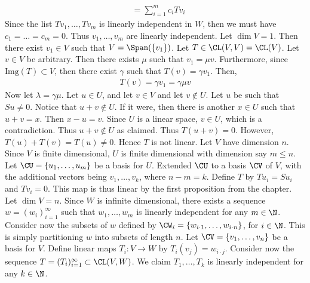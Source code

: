 \documentclass{book}
\begin{document}
\begin{enumerate}[label=\arabic*)]
\begin{align*}
        & = \sum_{i = 1}^{m}c_iTv_i
      \end{align*}
      Since the list $Tv_1, \dots, Tv_m$ is linearly independent in $W$, then we must have $c_1 = \dots = c_m = 0$. Thus $v_1, \dots, v_m$ are linearly independent. 
    \ii
    \ii
    \ii
      Let $\dim V = 1$. Then there exist $v_1 \in V$ such that $V = \Span(\{v_1\})$. Let $T \in \CL(V, V) = \CL(V)$. Let $v \in V$ be arbitrary. Then there exists $\mu$ such that $v_1 = \mu
      v$.  Furthermore, since $\text{Img}(T) \subset V$, then there exist $\gamma$ such that $T(v) = \gamma v_1$. Then,
      \begin{align*}
        T(v) = \gamma v_1 = \gamma\mu v
      \end{align*}
      Now let $\lambda = \gamma\mu$.
    \ii
    \ii
    \ii
      Let $u \in U$, and let $v \in V$ and let $v \not\in U$. Let $u$ be such that $Su \neq 0$. Notice that $u + v \not\in U$. If it were, then there is another $x \in U$ such that $u + v =
      x$. Then $x - u = v$. Since $U$ is a linear space, $v \in U$, which is a contradiction. Thus $u + v \not\in U$ as claimed. Thus $T(u + v) = 0$. However, $T(u) + T(v) = T(u) \neq 0$.
      Hence $T$ is not linear.
    \ii
      Let $V$ have dimension $n$. Since $V$ is finite dimensional, $U$ is finite dimensional with dimension say $m \leq n$. Let $\CU = \{u_1, \dots, u_m\}$ be a basis for $U$. Extended $\CU$
      to a basis $\CV$ of $V$, with the additional vectors being $v_1, \dots, v_k$, where $n - m = k$. Define $T$ by $Tu_i = Su_i$ and $Tv_i = 0$. This map is thus linear by the first
      proposition from the chapter.
    \ii
      Let $\dim V = n$. Since $W$ is infinite dimensional, there exists a sequence $w = (w_i)_{i = 1}^{\infty}$ such that $w_1, \dots, w_m$ is linearly independent for any $m \in \N$.
      Consider now the subsets of $w$ defined by $\CW_i = \{w_{i\cdot1}, \dots, w_{i\cdot n}\}$, for $i \in \N$. This is simply partitioning $w$ into subsets of length $n$. Let $\CV = \{v_1,
      \dots, v_n\}$ be a basis for $V$. Define linear maps $T_i: V \to W$ by $T_i(v_j) = w_{i\cdot j}$. Consider now the sequence $T = (T_i)_{i = 1}^{\infty} \subset \CL(V, W)$. We claim
      $T_1, \dots, T_k$ is linearly independent for any $k \in \N$.


\end{enumerate}
\end{document}
